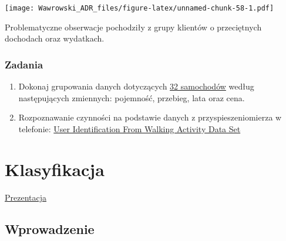 \documentclass[
]{book}
\newenvironment{Shaded}{\begin{snugshade}}{\end{snugshade}}
\newcommand{\DataTypeTok}[1]{\textcolor[rgb]{0.13,0.29,0.53}{#1}}
\newcommand{\KeywordTok}[1]{\textcolor[rgb]{0.13,0.29,0.53}{\textbf{#1}}}
\newcommand{\NormalTok}[1]{#1}
\newcommand{\OperatorTok}[1]{\textcolor[rgb]{0.81,0.36,0.00}{\textbf{#1}}}
\newcommand{\StringTok}[1]{\textcolor[rgb]{0.31,0.60,0.02}{#1}}
\begin{document}
\begin{Shaded}
\end{Shaded}

\texttt{[image: Wawrowski\_ADR\_files/figure-latex/unnamed-chunk-58-1.pdf]}

Problematyczne obserwacje pochodziły z grupy klientów o przeciętnych dochodach oraz wydatkach.

\hypertarget{zadania}{%
\subsection{Zadania}\label{zadania}}

\begin{enumerate}
\def\labelenumi{\arabic{enumi}.}
\item
  Dokonaj grupowania danych dotyczących \href{data/auta.csv}{32 samochodów} według następujących zmiennych: pojemność, przebieg, lata oraz cena.
\item
  Rozpoznawanie czynności na podstawie danych z przyspieszeniomierza w telefonie: \href{http://archive.ics.uci.edu/ml/datasets/User+Identification+From+Walking+Activity\#}{User Identification From Walking Activity Data Set}
\end{enumerate}

\hypertarget{klasyfikacja}{%
\chapter{Klasyfikacja}\label{klasyfikacja}}

\href{presentations/06_klasyfikacja.html}{Prezentacja}

\hypertarget{wprowadzenie-4}{%
\section{Wprowadzenie}\label{wprowadzenie-4}}
\end{document}
